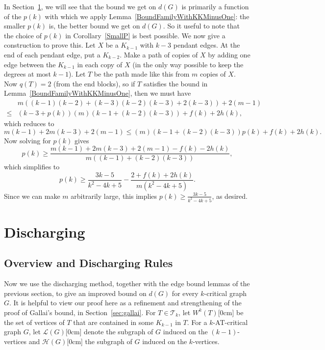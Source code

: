 \documentclass[12pt]{article}
\theoremstyle{plain}
\theoremstyle{definition}
\theoremstyle{remark}
\newcommand{\fancy}[1]{\mathcal{#1}}
\newcommand{\T}{\fancy{T}}
\renewcommand{\L}{\fancy{L}}
\newcommand{\HH}{\fancy{H}}
\newcommand{\aside}[1]{\marginnote{\scriptsize{#1}}[0cm]}
\begin{document}
In Section~\ref{discharging}, we will see that the bound we get on $d(G)$ is primarily a function of the $p(k)$ with which we 
apply Lemma~\ref{BoundFamilyWithKKMinusOne}: the smaller $p(k)$ is, the better bound we get on $d(G)$.  So it useful to note 
that the choice of $p(k)$ in Corollary~\ref{SmallP} is best possible.  We now give a construction to prove this.
Let $X$ be a $K_{k-1}$ with $k-3$ pendant edges.  At the end of each pendant edge, put a $K_{k-2}$.  Make a path of copies of $X$
by adding one edge between the $K_{k-1}$ in each copy of $X$ (in the only way possible to keep the degrees at most $k-1$).  Let 
$T$ be the path made like this from $m$ copies of $X$.  Now $q(T) = 2$ (from the end blocks), so if $T$ satisfies the bound in Lemma~\ref{BoundFamilyWithKKMinusOne}, then we must have
\begin{align*}
&m((k-1)(k-2) + (k-3)(k-2)(k-3) + 2(k-3)) + 2(m-1) \\
\le &(k-3 + p(k))(m)(k-1+(k-2)(k-3)) + f(k) + 2h(k),
\end{align*}
which reduces to
\[m(k-1) + 2m(k-3) + 2(m-1) \le (m)(k-1+(k-2)(k-3))p(k) + f(k) + 2h(k).\]
Now solving for $p(k)$ gives
\[p(k) \ge \frac{m(k-1)+2m(k-3)+2(m-1)-f(k)-2h(k)}{m((k-1)+(k-2)(k-3))},\] 
which simplifies to
\[p(k) \ge \frac{3k - 5}{k^2 - 4k + 5}-\frac{2+f(k)+2h(k)}{m(k^2-4k+5)}.\]
Since we can make $m$ arbitrarily large, this implies $p(k)\ge \frac{3k-5}{k^2-4k+5}$, as desired.

\section{Discharging}\label{discharging}

\subsection{Overview and Discharging Rules}
\label{discharging-overview}

Now we use the discharging method, together with the edge bound lemmas of the
previous section, to give an improved bound on $d(G)$ for every $k$-critical
graph $G$.  It is helpful to view our proof here as a refinement and
strengthening of the proof of Gallai's bound, in Section~\ref{sec:gallai}.  For
$T \in \T_k$, let $W^k(T)$\aside{$W^k(T)$} be the set of vertices of $T$ that
are contained in some $K_{k-1}$ in $T$.  For a $k$-AT-critical graph $G$, let
$\L(G)$\aside{$\L(G)$} denote the subgraph of $G$ induced on the
$(k-1)$-vertices and $\HH(G)$\aside{$\HH(G)$} the subgraph of $G$ induced on
the $k$-vertices.     
\end{document}
